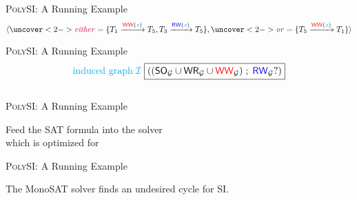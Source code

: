 \begin{frame}{\textsc{PolySI}: A Running Example}
	\vspace{-0.50cm}
	\[\tuple{
		\uncover<2->{\purple{\eithervar} = \set{T_{1} \rel{\WW(\keyxvar)} T_{5},
			T_{3} \rel{\RW(\keyxvar)} T_{5}}},
		\uncover<2->{\violet{\orvar} = \set{T_{5} \rel{\WW(\keyxvar)} T_{1}}}
	}\]

	\vspace{-0.30cm}
	\begin{center}
		\resizebox{0.80\textwidth}{!}{}
	\end{center}
	\vspace{-0.50cm}

\end{frame}

\begin{frame}{\textsc{PolySI}: A Running Example}
	\vspace{-0.50cm}
	\[
		\textcolor{cyan}{\text{induced graph}}\; \textcolor{cyan}{\mathcal{I}}\;
		  {\boxed{((\textup{\textsf{SO}}_{\mathcal{G}} \cup \textup{\textsf{WR}}_{\mathcal{G}} \cup \textcolor{red}{\textup{\textsf{WW}}}_{\mathcal{G}}) \;;\; \textcolor{blue}{\textup{\textsf{RW}}}_{\mathcal{G}}?)}}
	\]

  \begin{columns}
	\end{columns}

	\vspace{0.50cm}
	\vspace{-0.30cm}
\end{frame}

\begin{frame}{\textsc{PolySI}: A Running Example}
	\begin{center}
		Feed the SAT formula into the  solver~ \\[2pt]
		which is optimized for 

		\vspace{0.20cm}
	\end{center}
\end{frame}

\begin{frame}{\textsc{PolySI}: A Running Example}
	\begin{center}

		\vspace{0.20cm}
		The MonoSAT solver finds an undesired cycle for SI.
	\end{center}
\end{frame}

